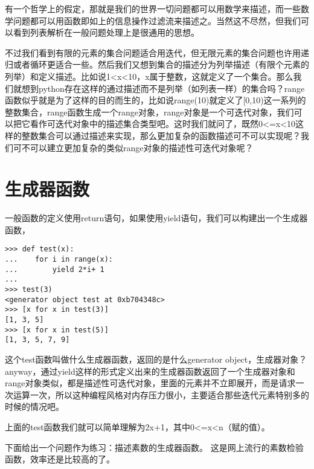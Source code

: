 \documentclass[12pt,oneside]{book}
\begin{document}
\begin{common-format}
有一个哲学上的假定，那就是我们的世界一切问题都可以用数学来描述，而一些数学问题都可以用函数即如上的信息操作过滤流来描述之。当然这不尽然，但我们可以看到列表解析在一般问题处理上是很通用的思想。

不过我们看到有限的元素的集合问题适合用迭代，但无限元素的集合问题也许用递归或者循环更适合一些。然后我们又想到集合的描述分为列举描述（有限个元素的列举）和定义描述。比如说1<x<10，x属于整数，这就定义了一个集合。那么我们就想到python存在这样的通过描述而不是列举（如列表一样）的集合吗？range函数似乎就是为了这样的目的而生的，比如说range(10)就定义了[0,10)这一系列的整数集合，range函数生成一个range对象，range对象是一个可迭代对象，我们可以把它看作可迭代对象中的描述集合类型吧。这时我们就问了，既然0<=x<10这样的整数集合可以通过描述来实现，那么更加复杂的函数描述可不可以实现呢？我们可不可以建立更加复杂的类似range对象的描述性可迭代对象呢？

\section{生成器函数}
一般函数的定义使用return语句，如果使用yield语句，我们可以构建出一个生成器函数，
\begin{Verbatim}
>>> def test(x):
...    for i in range(x):
...        yield 2*i+ 1
... 
>>> test(3)
<generator object test at 0xb704348c>
>>> [x for x in test(3)]
[1, 3, 5]
>>> [x for x in test(5)]
[1, 3, 5, 7, 9]
\end{Verbatim}

这个test函数叫做什么生成器函数，返回的是什么generator object，生成器对象？anyway，通过yield这样的形式定义出来的生成器函数返回了一个生成器对象和range对象类似，都是描述性可迭代对象，里面的元素并不立即展开，而是请求一次运算一次，所以这种编程风格对内存压力很小，主要适合那些迭代元素特别多的时候的情况吧。

上面的test函数我们就可以简单理解为2x+1，其中0<=x<n（赋的值）。

下面给出一个问题作为练习：描述素数的生成器函数。
这是网上流行的素数检验函数，效率还是比较高的了。


\end{common-format}
\end{document}

